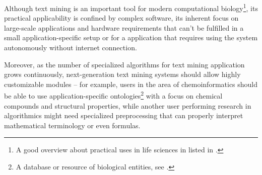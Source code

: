 \documentclass[a4paper, 12pt, twoside, reqn]{report}
\numberwithin{figure}{chapter}
\newtheorem[L]{boxedDefinition}{Definition}
\newtheorem[L]{boxedExample}{Example}
\begin{document}
Although text mining is an important tool for modern computational biology\footnote{A good overview about practical uses in life sciences in listed in \cite{galvez2008knowledge}.}, its practical applicability is confined by complex software, its inherent focus on large-scale applications and hardware requirements that can't be fulfilled in a small application-specific setup or for a application that requires using the system autonomously without internet connection.

Moreover, as the number of specialized algorithms for text mining application grows continuously, next-generation text mining systems should allow highly customizable modules -- for example, users in the area of chemoinformatics should be able to use application-specific ontologies\footnote{A database or resource of biological entities, see \cite[section 2.5.2]{wachinger2013next}.} with a focus on chemical compounds and structural properties, while another user performing research in algorithmics might need specialized preprocessing that can properly interpret mathematical terminology or even formulas.
\end{document}
